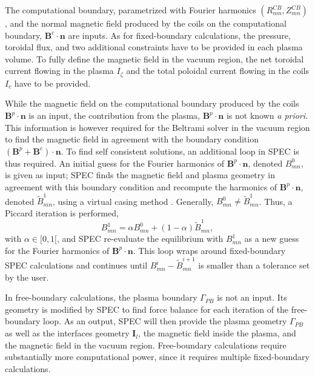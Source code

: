 \documentclass[my_thesis.tex]{subfiles}
\begin{document}
The computational boundary, parametrized with Fourier harmonics $(R^{CB}_{mn},Z^{CB}_{mn})$, and the normal magnetic field produced by the coils on the computational boundary, $\mathbf{B}^c\cdot\mathbf{n}$ are inputs. As for fixed-boundary calculations, the pressure, toroidal flux, and two additional constraints have to be provided in each plasma volume. To fully define the magnetic field in the vacuum region, the net toroidal current flowing in the plasma $I_\zeta$ and the total poloidal current flowing in the coils $I_c$ have to be provided. 

While the magnetic field on the computational boundary produced by the coils $\mathbf{B}^p\cdot\mathbf{n}$ is an input, the contribution from the plasma, $\mathbf{B}^p\cdot\mathbf{n}$ is not known \textit{a priori}. This information is however required for the Beltrami solver in the vacuum region to find the magnetic field in agreement with the boundary condition $(\mathbf{B}^p+\mathbf{B}^c)\cdot\mathbf{n}$. To find self consistent solutions, an additional loop in SPEC is thus required. An initial guess for the Fourier harmonics of $\mathbf{B}^p\cdot \mathbf{n}$, denoted $B_{mn}^0$, is given as input; SPEC finds the magnetic field and plasma geometry in agreement with this boundary condition and recompute the harmonics of $\mathbf{B}^p\cdot\mathbf{n}$, denoted $\tilde{B}_{mn}^1$, using a virtual casing method \citep{Lazerson2012,Hanson2015}. Generally, $B_{mn}^0\neq \tilde{B}_{mn}^1$. Thus, a Piccard iteration is performed,
\begin{equation}
	B_{mn}^1 = \alpha B_{mn}^0 + (1-\alpha) \tilde{B}_{mn}^1,
\end{equation}
with $\alpha\in[0,1[$, and SPEC re-evaluate the equilibrium with $B^1_{mn}$ as a new guess for the Fourier harmonics of $\mathbf{B}^p\cdot\mathbf{n}$. This loop wraps around fixed-boundary SPEC calculations and continues until $B_{mn}^i -\tilde{B}_{mn}^{i+1}$ is smaller than a tolerance set by the user.

In free-boundary calculations, the plasma boundary $\Gamma_{PB}$ is not an input. Its geometry is modified by SPEC to find force balance for each iteration of the free-boundary loop. As an output, SPEC will then provide the plasma geometry $\Gamma_{PB}$ as well as the interfaces geometry $\mathbf{I}_l$, the magnetic field inside the plasma, and the magnetic field in the vacuum region. Free-boundary calculations require substantially more computational power, since it requires multiple fixed-boundary calculations.
\end{document}

